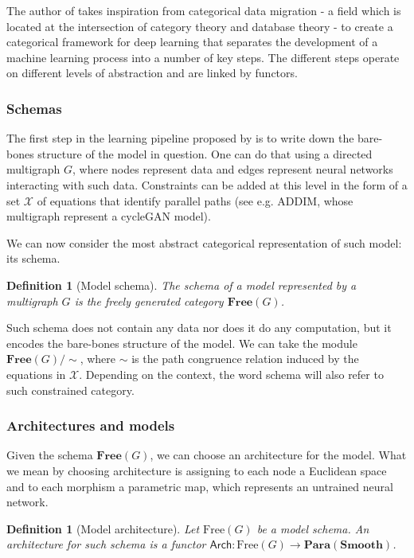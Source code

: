 \documentclass[12pt,a4paper,openright,twoside]{report}
\theoremstyle{plain}
\newtheorem{definition}[proposition]{Definition}
\theoremstyle{definition}
\begin{document}
The author of \cite{gavranovic2019compositional} takes inspiration from categorical data migration - a field which is located at the intersection of category theory and database theory - to create a categorical framework for deep learning that separates the development of a machine learning process into a number of key steps. The different steps operate on different levels of abstraction and are linked by functors.

\subsubsection{Schemas}

The first step in the learning pipeline proposed by \cite{gavranovic2019compositional} is to write down the bare-bones structure of the model in question. One can do that using a directed multigraph $G$, where nodes represent data and edges represent neural networks interacting with such data. Constraints can be added at this level in the form of a set $\mathcal{X}$ of equations that identify parallel paths (see e.g. ADDIM, whose multigraph represent a cycleGAN model).


We can now consider the most abstract categorical representation of such model: its schema. 

\begin{definition}[Model schema]
  The schema of a model represented by a multigraph $G$ is the freely generated category $\mathbf{Free}(G)$.
\end{definition}

Such schema does not contain any data nor does it do any computation, but it encodes the bare-bones structure of the model. We can take the module $\mathbf{Free}(G)/{\sim}$, where ${\sim}$ is the path congruence relation induced by the equations in $\mathcal{X}$. Depending on the context, the word schema will also refer to such constrained category.

\subsubsection{Architectures and models}


Given the schema $\mathbf{Free}(G)$, we can choose an architecture for the model. What we mean by choosing architecture is assigning to each node a Euclidean space and to each morphism a parametric map, which represents an untrained neural network.

\begin{definition}[Model architecture]
  Let $\mathrm{Free}(G)$ be a model schema. An architecture for such schema is a functor $\mathsf{Arch}: \mathrm{Free}(G) \to \mathbf{Para}(\mathbf{Smooth})$.
\end{definition}
\end{document}

